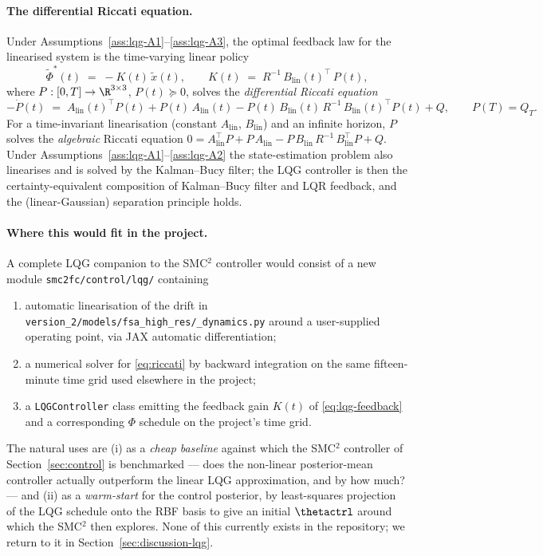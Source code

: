 \paragraph{The differential Riccati equation.}
Under Assumptions~\ref{ass:lqg-A1}--\ref{ass:lqg-A3}, the optimal
feedback law for the linearised system is the time-varying linear policy
\begin{equation}
  \tilde \Phi^*(t) \;=\; -K(t)\,\tilde x(t),
  \qquad K(t) \;=\; R^{-1}\,B_{\mathrm{lin}}(t)^{\!\top}\,P(t),
  \label{eq:lqg-feedback}
\end{equation}
where $P:[0,T] \to \R^{3\times 3}$, $P(t) \succeq 0$, solves the
\emph{differential Riccati equation}
\begin{equation}
  -\dot P(t) \;=\; A_{\mathrm{lin}}(t)^{\!\top} P(t)
                   + P(t)\,A_{\mathrm{lin}}(t)
                   - P(t)\,B_{\mathrm{lin}}(t)\,R^{-1}\,
                     B_{\mathrm{lin}}(t)^{\!\top} P(t)
                   + Q,
  \qquad P(T) = Q_T.
  \label{eq:riccati}
\end{equation}
For a time-invariant linearisation (constant $A_{\mathrm{lin}}$,
$B_{\mathrm{lin}}$) and an infinite horizon, $P$ solves the
\emph{algebraic} Riccati equation
$0 = A_{\mathrm{lin}}^{\!\top} P + P\,A_{\mathrm{lin}} - P\,B_{\mathrm{lin}}\,R^{-1}\,B_{\mathrm{lin}}^{\!\top} P + Q$.
Under Assumptions~\ref{ass:lqg-A1}--\ref{ass:lqg-A2} the state-estimation
problem also linearises and is solved by the Kalman--Bucy filter; the
LQG controller is then the certainty-equivalent composition of
Kalman--Bucy filter and LQR feedback, and the (linear-Gaussian)
separation principle holds.

\paragraph{Where this would fit in the project.}
A complete LQG companion to the SMC${}^2$ controller would consist of a
new module \texttt{smc2fc/control/lqg/} containing
\begin{enumerate}
  \item automatic linearisation of the drift in
        \texttt{version\_2/models/fsa\_high\_res/\_dynamics.py} around a
        user-supplied operating point, via JAX automatic differentiation;
  \item a numerical solver for \eqref{eq:riccati} by backward integration
        on the same fifteen-minute time grid used elsewhere in the
        project;
  \item a \texttt{LQGController} class emitting the feedback gain $K(t)$
        of \eqref{eq:lqg-feedback} and a corresponding $\Phi$ schedule
        on the project's time grid.
\end{enumerate}
The natural uses are (i) as a \emph{cheap baseline} against which the
SMC${}^2$ controller of Section~\ref{sec:control} is benchmarked --- does
the non-linear posterior-mean controller actually outperform the linear
LQG approximation, and by how much? --- and (ii) as a \emph{warm-start}
for the control posterior, by least-squares projection of the LQG
schedule onto the RBF basis to give an initial $\thetactrl$ around which
the SMC${}^2$ then explores. None of this currently exists in the
repository; we return to it in Section~\ref{sec:discussion-lqg}.
